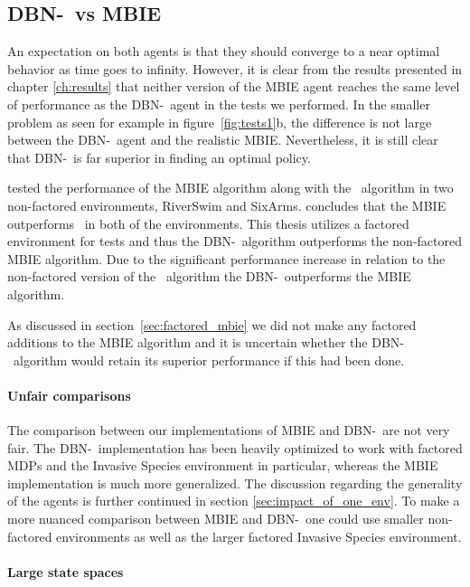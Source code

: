 \subsection{DBN-\etre\ vs MBIE}
\label{sec:dbn_vs_mbie}

An expectation on both agents is that they should converge to a near optimal
behavior as time goes to infinity. However, it is clear from the results
presented in chapter \ref{ch:results} that neither version of the MBIE agent
reaches the same level of performance as the DBN-\etre\ agent in the tests we
performed. In the smaller problem as seen for example in
figure~\ref{fig:tests1}b, the difference is not large between the DBN-\etre\ agent
and the realistic MBIE. Nevertheless, it is still clear that DBN-\etre\ is far
superior in finding an optimal policy.

\textcite{strehl2004empirical} tested the performance of the MBIE algorithm
along with the \etre\ algorithm in two non-factored environments, RiverSwim and
SixArms. \textcite{strehl2004empirical} concludes that the MBIE outperforms
\etre\ in both of the environments. This thesis utilizes a factored environment
for tests and thus the DBN-\etre\ algorithm outperforms the non-factored MBIE
algorithm. Due to the significant performance increase in relation to the
non-factored version of the \etre\ algorithm the DBN-\etre\ outperforms the
MBIE algorithm.

As discussed in section~\ref{sec:factored_mbie} we did not make any factored
additions to the MBIE algorithm and it is uncertain whether the DBN-\etre\
algorithm would retain its superior performance if this had been done.

\paragraph{Unfair comparisons}

The comparison between our implementations of MBIE and DBN-\etre\ are not very
fair. The DBN-\etre\ implementation has been heavily optimized to work with
factored MDPs and the Invasive Species environment in particular, whereas the
MBIE implementation is much more generalized. The discussion regarding the
generality of the agents is further continued in section
\ref{sec:impact_of_one_env}. To make a more nuanced comparison between MBIE and
DBN-\etre\ one could use smaller non-factored environments as well as the
larger factored Invasive Species environment.


\paragraph{Large state spaces}

